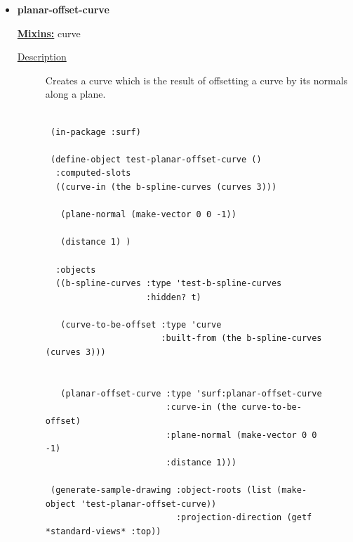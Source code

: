 \documentclass [11pt]{book}
\begin{document}
\begin{itemize}
\begin{description}
\end{description}







\item {}
\label{prim:planar-offset-curve}
\textbf{planar-offset-curve}


\textbf{
\underline{Mixins:}} curve





\begin{description}

\item [
\underline{Description}]


Creates a curve which is the result of offsetting a curve by its normals along a plane.



\end{description}




\begin{figure}
\begin{lrbox}{\boxedverb}
\begin{minipage}{\linewidth}
{\small

\begin{verbatim}
 
 (in-package :surf)

 (define-object test-planar-offset-curve ()
  :computed-slots
  ((curve-in (the b-spline-curves (curves 3)))
   
   (plane-normal (make-vector 0 0 -1))
   
   (distance 1) )
  
  :objects
  ((b-spline-curves :type 'test-b-spline-curves
                    :hidden? t)
   
   (curve-to-be-offset :type 'curve
                       :built-from (the b-spline-curves (curves 3)))
   
   
   (planar-offset-curve :type 'surf:planar-offset-curve
                        :curve-in (the curve-to-be-offset)
                        :plane-normal (make-vector 0 0 -1)
                        :distance 1)))

 (generate-sample-drawing :object-roots (list (make-object 'test-planar-offset-curve))
                          :projection-direction (getf *standard-views* :top))

 
\end{verbatim}}
\end{minipage}
\end{lrbox}
\fbox{\usebox{\boxedverb}}


\end{figure}
\end{itemize}
\end{document}
